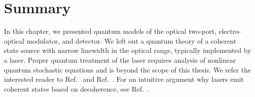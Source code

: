 \section*{Summary}

In this chapter, we presented quantum models of the optical two-port, electro-optical modulator, and detector.
We left out a quantum theory of a coherent state source with narrow linewidth in the optical range, typically implemented by a laser.
Proper quantum treatment of the laser requires analysis of nonlinear quantum stochastic equations and is beyond the scope of this thesis.
We refer the interested reader to Ref.~\cite[p.~900]{Mandel1995} and Ref.~\cite{Haken2012,Gardiner2000}.
For an intuitive argument why lasers emit coherent states based on decoherence, see Ref.~\cite{Gea1998}.

